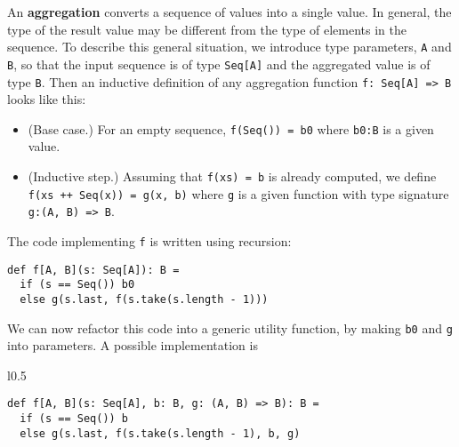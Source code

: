 An \textbf{aggregation} converts a sequence of
values into a single value. In general, the type of the result value
may be different from the type of elements in the sequence. To describe
this general situation, we introduce type parameters, \lstinline!A!
and \lstinline!B!, so that the input sequence is of type \lstinline!Seq[A]!
and the aggregated value is of type \lstinline!B!. Then an inductive
definition of any aggregation function \lstinline!f: Seq[A] => B!
looks like this:
\begin{itemize}
\item (Base case.) For an empty sequence, \lstinline!f(Seq()) = b0! where
\lstinline!b0:B! is a given value.
\item (Inductive step.) Assuming that \lstinline!f(xs) = b! is already
computed, we define \lstinline!f(xs ++ Seq(x)) = g(x, b)! where \lstinline!g!
is a given function with type signature \lstinline!g:(A, B) => B!.
\end{itemize}
The code implementing \lstinline!f! is written using recursion:
\begin{lstlisting}
def f[A, B](s: Seq[A]): B =
  if (s == Seq()) b0
  else g(s.last, f(s.take(s.length - 1)))
\end{lstlisting}
We can now refactor this code into a generic utility function, by
making \lstinline!b0! and \lstinline!g! into parameters. A possible
implementation is

\begin{wrapfigure}{l}{0.5\columnwidth}%
\vspace{0.4\baselineskip}
\begin{lstlisting}
def f[A, B](s: Seq[A], b: B, g: (A, B) => B): B =
  if (s == Seq()) b
  else g(s.last, f(s.take(s.length - 1), b, g)
\end{lstlisting}

\vspace{-1.5\baselineskip}
\end{wrapfigure}%

